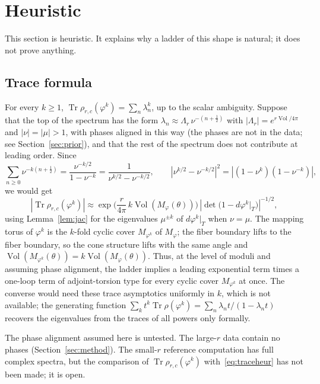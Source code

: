\documentclass[11pt]{amsart}
\theoremstyle{definition}
\theoremstyle{remark}
\newcommand{\Vol}{\operatorname{Vol}}
\newcommand{\Tr}{\operatorname{Tr}}
\begin{document}
\section{Heuristic}\label{sec:heuristic}

This section is heuristic. It explains why a ladder of this shape is natural; it
does not prove anything.

\subsection{Trace formula}
For every $k \ge 1$, $\Tr \rho_{r,c}(\varphi^k) = \sum_n \lambda_n^k$, up to the
scalar ambiguity. Suppose that the top of the spectrum has the form
$\lambda_n \approx \Lambda_r\, \nu^{-(n+\frac12)}$ with $|\Lambda_r| = e^{r\Vol/4\pi}$
and $|\nu| = |\mu| > 1$, with phases aligned in this way (the phases are not in the
data; see Section~\ref{sec:prior}), and that the rest of the spectrum does not
contribute at leading order. Since
\[
\sum_{n \ge 0} \nu^{-k(n+\frac12)} = \frac{\nu^{-k/2}}{1 - \nu^{-k}}
= \frac{1}{\nu^{k/2} - \nu^{-k/2}},
\qquad
\left|\nu^{k/2} - \nu^{-k/2}\right|^2 = \left|(1-\nu^k)(1-\nu^{-k})\right|,
\]
we would get
\begin{equation}\label{eq:traceheur}
\left|\Tr\rho_{r,c}(\varphi^k)\right| \approx
\exp\!\Big(\frac{r}{4\pi}\, k\Vol(M_\varphi(\theta))\Big)\,
\left|\det\big(1 - d\varphi^k|_T\big)\right|^{-1/2},
\end{equation}
using Lemma~\ref{lem:jac} for the eigenvalues $\mu^{\pm k}$ of $d\varphi^k|_T$ when
$\nu = \mu$. The mapping torus of $\varphi^k$ is the $k$-fold cyclic cover
$M_{\varphi^k}$ of $M_\varphi$; the fiber boundary lifts to the fiber boundary, so the
cone structure lifts with the same angle and $\Vol(M_{\varphi^k}(\theta)) =
k\Vol(M_\varphi(\theta))$. Thus, at the level of moduli and assuming phase
alignment, the ladder implies a leading exponential term times a one-loop term of
adjoint-torsion type for every cyclic cover $M_{\varphi^k}$ at once. The converse
would need these trace asymptotics uniformly in $k$, which is not available; the
generating function
$\sum_k t^k \Tr\rho(\varphi^k) = \sum_n \lambda_n t/(1 - \lambda_n t)$ recovers the
eigenvalues from the traces of all powers only formally.

The phase alignment assumed here is untested. The large-$r$ data contain no phases
(Section~\ref{sec:method}). The small-$r$ reference computation has full complex
spectra, but the comparison of $\Tr\rho_{r,c}(\varphi^k)$ with~\eqref{eq:traceheur}
has not been made; it is open.
\end{document}
